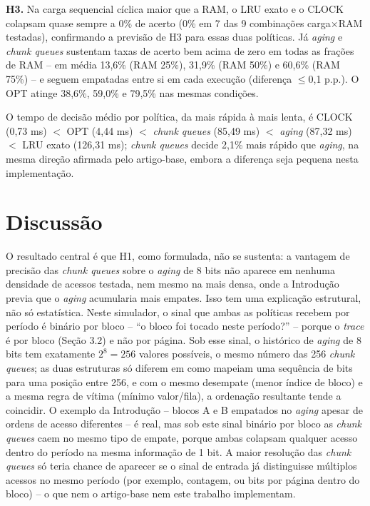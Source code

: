 \documentclass[12pt]{article}
\begin{document}
\textbf{H3.} Na carga sequencial cíclica maior que a RAM, o LRU exato e o CLOCK colapsam quase sempre a 0\% de acerto (0\% em 7 das 9 combinações carga$\times$RAM testadas), confirmando a previsão de H3 para essas duas políticas. Já \textit{aging} e \textit{chunk queues} sustentam taxas de acerto bem acima de zero em todas as frações de RAM -- em média 13,6\% (RAM 25\%), 31,9\% (RAM 50\%) e 60,6\% (RAM 75\%) -- e seguem empatadas entre si em cada execução (diferença $\leq$0,1 p.p.). O OPT atinge 38,6\%, 59,0\% e 79,5\% nas mesmas condições.

O tempo de decisão médio por política, da mais rápida à mais lenta, é CLOCK (0,73 ms) $<$ OPT (4,44 ms) $<$ \textit{chunk queues} (85,49 ms) $<$ \textit{aging} (87,32 ms) $<$ LRU exato (126,31 ms); \textit{chunk queues} decide 2,1\% mais rápido que \textit{aging}, na mesma direção afirmada pelo artigo-base, embora a diferença seja pequena nesta implementação.

\section{Discussão}

O resultado central é que H1, como formulada, não se sustenta: a vantagem de precisão das \textit{chunk queues} sobre o \textit{aging} de 8 bits não aparece em nenhuma densidade de acessos testada, nem mesmo na mais densa, onde a Introdução previa que o \textit{aging} acumularia mais empates. Isso tem uma explicação estrutural, não só estatística. Neste simulador, o sinal que ambas as políticas recebem por período é binário por bloco -- ``o bloco foi tocado neste período?'' -- porque o \textit{trace} é por bloco (Seção 3.2) e não por página. Sob esse sinal, o histórico de \textit{aging} de 8 bits tem exatamente $2^8=256$ valores possíveis, o mesmo número das 256 \textit{chunk queues}; as duas estruturas só diferem em como mapeiam uma sequência de bits para uma posição entre 256, e com o mesmo desempate (menor índice de bloco) e a mesma regra de vítima (mínimo valor/fila), a ordenação resultante tende a coincidir. O exemplo da Introdução -- blocos A e B empatados no \textit{aging} apesar de ordens de acesso diferentes -- é real, mas sob este sinal binário por bloco as \textit{chunk queues} caem no mesmo tipo de empate, porque ambas colapsam qualquer acesso dentro do período na mesma informação de 1 bit. A maior resolução das \textit{chunk queues} só teria chance de aparecer se o sinal de entrada já distinguisse múltiplos acessos no mesmo período (por exemplo, contagem, ou bits por página dentro do bloco) -- o que nem o artigo-base nem este trabalho implementam.
\end{document}
